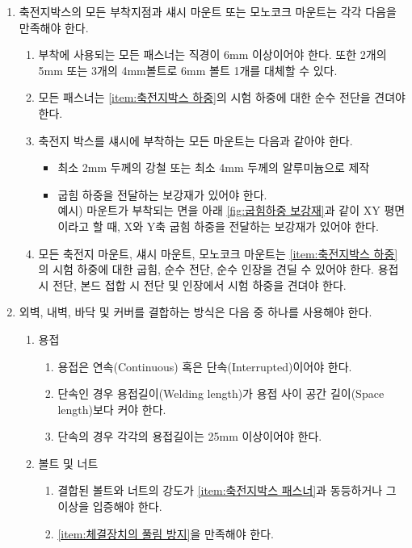 \documentclass[final,a4paper,10pt]{report}
\begin{document}
\begin{enumerate}
  \item 축전지박스의 모든 부착지점과 섀시 마운트 또는 모노코크 마운트는 각각 다음을 만족해야 한다. \label{item:축전지박스 마운트}
    \begin{enumerate}
      \item 부착에 사용되는 모든 패스너는 직경이 6mm 이상이어야 한다. 또한 2개의 5mm 또는 3개의 4mm볼트로 6mm 볼트 1개를 대체할 수 있다. \label{item:축전지박스 패스너}
      \item 모든 패스너는 \cref{item:축전지박스 하중}의 시험 하중에 대한 순수 전단을 견뎌야 한다.
      
      \item 축전지 박스를 섀시에 부착하는 모든 마운트는 다음과 같아야 한다.  
        \begin{itemize}
          \item 최소 2mm 두께의 강철 또는 최소 4mm 두께의 알루미늄으로 제작  
          \item 굽힘 하중을 전달하는 보강재가 있어야 한다.\\  
            예시) 마운트가 부착되는 면을 아래 \cref{fig:굽힘하중 보강재}과 같이 XY 평면이라고 할 때, X와 Y축 굽힘 하중을 전달하는 보강재가 있어야 한다.
        \end{itemize}
        
        
      \item 모든 축전지 마운트, 섀시 마운트, 모노코크 마운트는 \cref{item:축전지박스 하중}의 시험 하중에 대한 굽힘, 순수 전단, 순수 인장을 견딜 수 있어야 한다. 용접 시 전단, 본드 접합 시 전단 및 인장에서 시험 하중을 견뎌야 한다.
    \end{enumerate}
    
  \item 외벽, 내벽, 바닥 및 커버를 결합하는 방식은 다음 중 하나를 사용해야 한다.
    \begin{enumerate}
      \item 용접
        \begin{enumerate}
          \item 용접은 연속(Continuous) 혹은 단속(Interrupted)이어야 한다.
          \item 단속인 경우 용접길이(Welding length)가 용접 사이 공간 길이(Space length)보다 커야 한다.
          \item 단속의 경우 각각의 용접길이는 25mm 이상이어야 한다.
        \end{enumerate}

      \item 볼트 및 너트
        \begin{enumerate}
          \item 결합된 볼트와 너트의 강도가 \cref{item:축전지박스 패스너}과 동등하거나 그 이상을 입증해야 한다.
          \item \cref{item:체결장치의 풀림 방지}을 만족해야 한다.
        \end{enumerate}
    \end{enumerate}
    

\end{enumerate}
\end{document}
